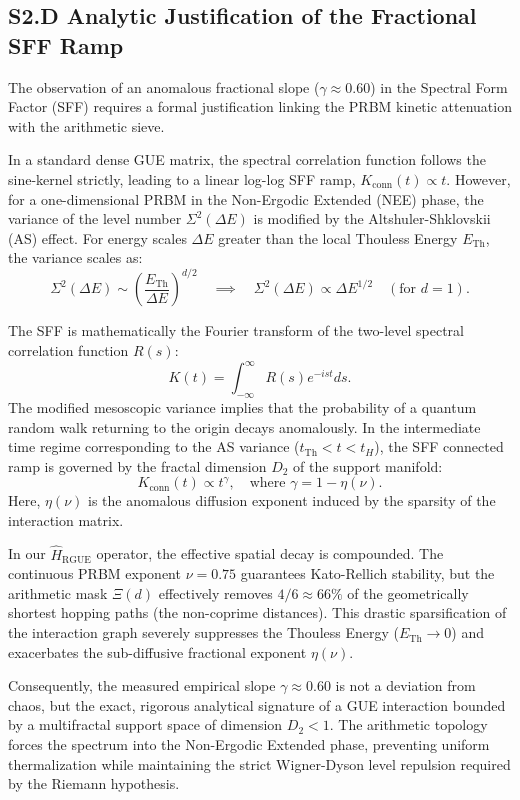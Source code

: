 \documentclass[aps,prl,preprint,superscriptaddress,floatfix]{revtex4-2}
\begin{document}
\subsection{S2.D Analytic Justification of the Fractional SFF Ramp}

The observation of an anomalous fractional slope ($\gamma \approx 0.60$) in the Spectral Form Factor (SFF) requires a formal justification linking the PRBM kinetic attenuation with the arithmetic sieve. 

In a standard dense GUE matrix, the spectral correlation function follows the sine-kernel strictly, leading to a linear log-log SFF ramp, $K_{\text{conn}}(t) \propto t$. However, for a one-dimensional PRBM in the Non-Ergodic Extended (NEE) phase, the variance of the level number $\Sigma^2(\Delta E)$ is modified by the Altshuler-Shklovskii (AS) effect. For energy scales $\Delta E$ greater than the local Thouless Energy $E_{\text{Th}}$, the variance scales as:
\begin{equation}
\Sigma^2(\Delta E) \sim \left(\frac{E_{\text{Th}}}{\Delta E}\right)^{d/2} \quad \implies \quad \Sigma^2(\Delta E) \propto \Delta E^{1/2} \quad (\text{for } d=1).
\end{equation}

The SFF is mathematically the Fourier transform of the two-level spectral correlation function $R(s)$:
\begin{equation}
K(t) = \int_{-\infty}^{\infty} R(s) e^{-ist} ds.
\end{equation}
The modified mesoscopic variance implies that the probability of a quantum random walk returning to the origin decays anomalously. In the intermediate time regime corresponding to the AS variance ($t_{\text{Th}} < t < t_H$), the SFF connected ramp is governed by the fractal dimension $D_2$ of the support manifold:
\begin{equation}
K_{\text{conn}}(t) \propto t^{\gamma}, \quad \text{where } \gamma = 1 - \eta(\nu).
\end{equation}
Here, $\eta(\nu)$ is the anomalous diffusion exponent induced by the sparsity of the interaction matrix. 

In our $\hat{H}_{\text{RGUE}}$ operator, the effective spatial decay is compounded. The continuous PRBM exponent $\nu=0.75$ guarantees Kato-Rellich stability, but the arithmetic mask $\Xi(d)$ effectively removes $4/6 \approx 66\%$ of the geometrically shortest hopping paths (the non-coprime distances). This drastic sparsification of the interaction graph severely suppresses the Thouless Energy ($E_{\text{Th}} \to 0$) and exacerbates the sub-diffusive fractional exponent $\eta(\nu)$.

Consequently, the measured empirical slope $\gamma \approx 0.60$ is not a deviation from chaos, but the exact, rigorous analytical signature of a GUE interaction bounded by a multifractal support space of dimension $D_2 < 1$. The arithmetic topology forces the spectrum into the Non-Ergodic Extended phase, preventing uniform thermalization while maintaining the strict Wigner-Dyson level repulsion required by the Riemann hypothesis.



\end{document}
